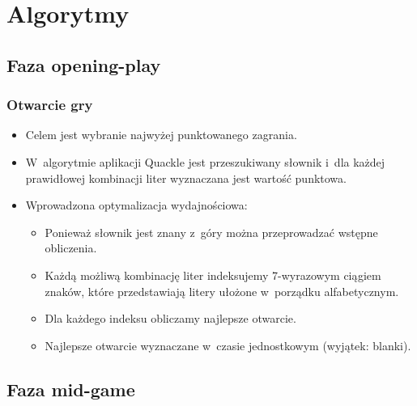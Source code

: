 \documentclass[10pt,a4paper]{beamer}
\begin{document}
\section{Algorytmy}
\subsection{Faza opening-play}

\begin{frame}
	\frametitle{Otwarcie gry}

	\begin{itemize}
		\item Celem jest wybranie najwyżej punktowanego zagrania.
		\item W~algorytmie aplikacji Quackle jest przeszukiwany słownik i~dla każdej prawidłowej kombinacji liter wyznaczana jest wartość punktowa.
		\item Wprowadzona optymalizacja wydajnościowa:
			\begin{itemize}
				\item Ponieważ słownik jest znany z~góry można przeprowadzać wstępne obliczenia.
				\item Każdą możliwą kombinację liter indeksujemy 7-wyrazowym ciągiem znaków, które przedstawiają litery ułożone w~porządku alfabetycznym.
				\item Dla każdego indeksu obliczamy najlepsze otwarcie.
				\item Najlepsze otwarcie wyznaczane w~czasie jednostkowym (wyjątek: blanki).
			\end{itemize}
	\end{itemize}
\end{frame}

\subsection{Faza mid-game}
\captionsetup[figure]{skip=2pt}
\end{document}
